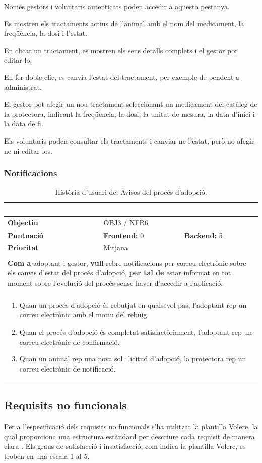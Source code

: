 \documentclass[11pt,a4paper]{report}
\newcommand{\HU}[9]{%
\begin{table}[H]\centering\footnotesize\renewcommand{\arraystretch}{1.1}%
\setlength{\extrarowheight}{0pt}%
\begin{tabular}{|l|p{4.8cm}|p{4.8cm}|}\hline
\rowcolor{oceanblue}\textcolor{white}{\textbf{Història d'Usuari}} & \multicolumn{2}{l|}{\textcolor{white}{#2}} \\\hline
\textbf{Objectiu} & \multicolumn{2}{l|}{#1} \\\hline
\rowcolor{gray!10}\textbf{Puntuació} & \textbf{Frontend: } #3 & \textbf{Backend: } #4 \\\hline
\textbf{Prioritat} & \multicolumn{2}{l|}{#5} \\\hline
\rowcolor{oceanblue}\multicolumn{3}{|l|}{\textcolor{white}{\textbf{Descripció}}} \\\hline
\multicolumn{3}{|p{12.5cm}|}{\textbf{Com a} #6, \textbf{vull} #7, \textbf{per tal de} #8.} \\\hline
\rowcolor{oceanblue}\multicolumn{3}{|l|}{\textcolor{white}{\textbf{Criteris d'Acceptació}}} \\\hline
\multicolumn{3}{|p{12.5cm}|}{\begin{enumerate}[leftmargin=0.4cm,topsep=0pt,parsep=0pt,itemsep=1pt,partopsep=0pt,after=\vspace{-3pt}] #9 \end{enumerate}} \\\hline
\end{tabular}\caption[HU: #2]{Història d'usuari de: #2.}\label{tab:hu_#1}\end{table}%
}
\begin{document}
    {
        \item Només gestors i voluntaris autenticats poden accedir a aquesta pestanya.
        \item Es mostren els tractaments actius de l'animal amb el nom del medicament, la freqüència, la dosi i l'estat.
        \item En clicar un tractament, es mostren els seus detalls complets i el gestor pot editar-lo.
        \item En fer doble clic, es canvia l'estat del tractament, per exemple de pendent a administrat.
        \item El gestor pot afegir un nou tractament seleccionant un medicament del catàleg de la protectora, indicant la freqüència, la dosi, la unitat de mesura, la data d'inici i la data de fi.
        \item Els voluntaris poden consultar els tractaments i canviar-ne l'estat, però no afegir-ne ni editar-los.
    }


\subsubsection{Notificacions}
    \HU{OBJ3 / NFR6}
    {Avisos del procés d'adopció}
    {0}
    {5}
    {Mitjana}
    {adoptant i gestor}
    {rebre notificacions per correu electrònic sobre els canvis d'estat del procés d'adopció}
    {estar informat en tot moment sobre l'evolució del procés sense haver d'accedir a l'aplicació}
    {
        \item Quan un procés d'adopció és rebutjat en qualsevol pas, l'adoptant rep un correu electrònic amb el motiu del rebuig.
        \item Quan el procés d'adopció és completat satisfactòriament, l'adoptant rep un correu electrònic de confirmació.
        \item Quan un animal rep una nova sol·licitud d'adopció, la protectora rep un correu electrònic de notificació.
    }

\newpage

\subsection{Requisits no funcionals}
Per a l'especificació dels requisits no funcionals s'ha utilitzat la plantilla Volere, la qual proporciona una estructura estàndard per descriure cada requisit de manera clara \cite{robertson_mastering_2011}. Els graus de satisfacció i insatisfacció, com indica la plantilla Volere, es troben en una escala 1 al 5.
\end{document}
